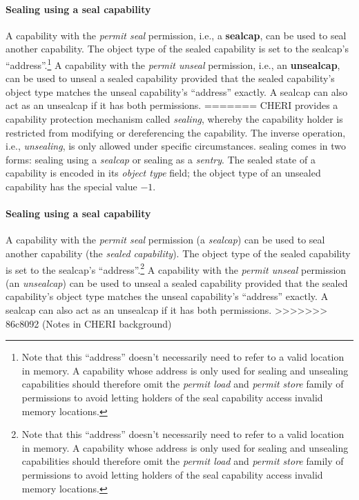 \documentclass[main.tex]{subfiles}
\begin{document}
\paragraph{Sealing using a seal capability} A capability with the \emph{permit seal} permission, i.e., a \textbf{\gls{sealcap}}, can be used to seal another capability. The object type of the sealed capability is set to the \gls{sealcap}'s \enquote{address}.\footnote{Note that this \enquote{address} doesn't necessarily need to refer to a valid location in memory. A capability whose address is only used for sealing and unsealing capabilities should therefore omit the \emph{permit load} and \emph{permit store} family of permissions to avoid letting holders of the seal capability access invalid memory locations.} A capability with the \emph{permit unseal} permission, i.e., an \textbf{\gls{unsealcap}}, can be used to unseal a sealed capability provided that the sealed capability's object type matches the unseal capability's \enquote{address} exactly. A \gls{sealcap} can also act as an \gls{unsealcap} if it has both permissions.
=======
CHERI provides a capability protection mechanism called \emph{\gls{sealing}}, whereby the capability holder is restricted from modifying or dereferencing the capability. The inverse operation, i.e., \emph{\gls{unsealing}}, is only allowed under specific circumstances. \Gls{sealing} comes in two forms: \gls{sealing} using a \emph{\gls{sealcap}} or \gls{sealing} as a \emph{\gls{sentry}}.  The sealed state of a capability is encoded in its \emph{object type} field; the object type of an unsealed capability has the special value $-1$.

\paragraph{Sealing using a seal capability} A capability with the \emph{permit seal} permission (a \emph{\gls{sealcap}}) can be used to seal another capability (the \emph{sealed capability}). The object type of the sealed capability is set to the \gls{sealcap}'s \enquote{address}.\footnote{Note that this \enquote{address} doesn't necessarily need to refer to a valid location in memory. A capability whose address is only used for sealing and unsealing capabilities should therefore omit the \emph{permit load} and \emph{permit store} family of permissions to avoid letting holders of the seal capability access invalid memory locations.} A capability with the \emph{permit unseal} permission (an \emph{\gls{unsealcap}}) can be used to unseal a sealed capability provided that the sealed capability's object type matches the unseal capability's \enquote{address} exactly. A \gls{sealcap} can also act as an \gls{unsealcap} if it has both permissions.
>>>>>>> 86c8092 (Notes in CHERI background)
\end{document}
